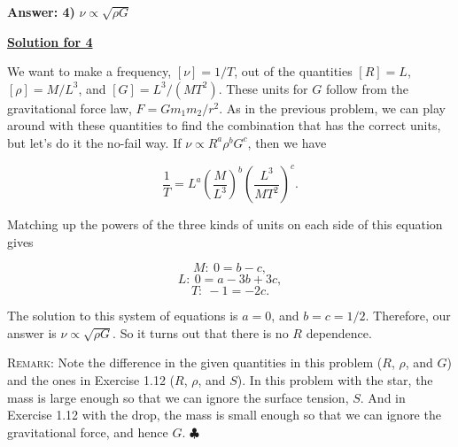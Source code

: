 \textbf{Answer: 4)} $\nu \propto \sqrt{\rho G}$

\underline{\textbf{Solution for 4}}

We want to make a frequency, $[\nu] = 1/T$, out of the quantities $[R] = L$, $[\rho] = M/L^3$, and $[G] = L^3/(MT^2)$. These units for $G$ follow from the gravitational force law, $F = Gm_1m_2/r^2$. As in the previous problem, we can play around with these quantities to find the combination that has the correct units, but let's do it the no-fail way. If $\nu \propto R^a \rho^b G^c$, then we have

\begin{equation} \frac{1}{T} = L^a \left(\frac{M}{L^3}\right)^b \left(\frac{L^3}{MT^2}\right)^c. \tag{1.23} \end{equation}

Matching up the powers of the three kinds of units on each side of this equation gives

\begin{equation} M:\ 0 = b-c, \end{equation}
\begin{equation} L:\ 0 = a-3b+3c, \end{equation}
\begin{equation} T:\ -1 = -2c. \tag{1.24} \end{equation}

The solution to this system of equations is $a = 0$, and $b = c = 1/2$. Therefore, our answer is $\nu \propto \sqrt{\rho G}$. So it turns out that there is no $R$ dependence.

\textsc{Remark:} Note the difference in the given quantities in this problem ($R$, $\rho$, and $G$) and the ones in Exercise 1.12 ($R$, $\rho$, and $S$). In this problem with the star, the mass is large enough so that we can ignore the surface tension, $S$. And in Exercise 1.12 with the drop, the mass is small enough so that we can ignore the gravitational force, and hence $G$. $\clubsuit$